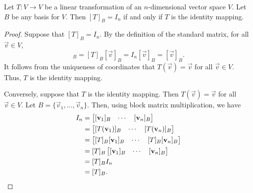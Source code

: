 \documentclass{homework}
\begin{document}
	\question Let $T : V \to V$ be a linear transformation of an $n$-dimensional vector space $V$. Let $B$ be any basis for $V$. Then $[T]_B = I_n$ if and only if $T$ is the identity mapping.
	\begin{proof}
		Suppose that $[T]_B = I_n$. By the definition of the standard matrix, for all $\vec{v} \in V$,
		\begin{equation*}
			[T(\vec{v})]_B = [T]_B[\vec{v}]_B = I_n[\vec{v}]_B = [\vec{v}]_B.
		\end{equation*}
		It follows from the uniqueness of coordinates that $T(\vec{v}) = \vec{v}$ for all $\vec{v} \in V$. Thus, $T$ is the identity mapping.
		
		Conversely, suppose that $T$ is the identity mapping. Then $T(\vec{v}) = \vec{v}$ for all $\vec{v} \in V$. Let $B = \{\vec{v}_1, \dots, \vec{v}_n\}$. Then, using block matrix multiplication, we have
		\begin{equation*}
			\begin{aligned}
			I_n &= \left[\begin{matrix}[\mathbf{v}_1]_B & \cdots& [\mathbf{v}_n]_B\end{matrix}\right] \\
			&= \left[\begin{matrix}[T(\mathbf{v}_1)]_B & \cdots& [T(\mathbf{v}_n)]_B\end{matrix}\right] \\
			&= \left[\begin{matrix}[T]_B[\mathbf{v}_1]_B & \cdots&[T]_B [\mathbf{v}_n]_B\end{matrix}\right] \\
			&= [T]_B \left[\begin{matrix}[\mathbf{v}_1]_B & \cdots& [\mathbf{v}_n]_B\end{matrix}\right] \\
			&= [T]_B I_n \\
			&= [T]_B.
			\end{aligned}
		\end{equation*}
	\end{proof}
	
\end{document}
